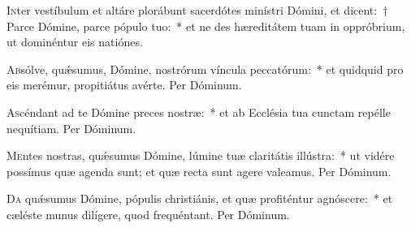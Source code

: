 \documentclass[vesperale_romanum.tex]{subfiles}
\begin{document}

\newpage
{}

\lettrine{I}{n}ter vestíbulum et altáre plorábunt sacerdótes minístri Dómini, et dicent:~† Parce Dómine, parce pópulo tuo:~* et ne des hæreditátem tuam in oppróbrium, ut dominéntur eis natiónes.





\oratio

\lettrine{A}{b}sólve, quǽsumus, Dómine, nostrórum víncula peccatórum:~* et quidquid pro eis merémur, propitiátus avérte.
Per Dóminum.



\oratio

\lettrine{A}{s}céndant ad te Dómine preces nostræ:~* et ab Ecclésia tua cunctam repélle nequítiam. Per Dóminum.



\oratio

\lettrine{M}{e}ntes nostras, quǽsumus Dómine, lúmine tuæ claritátis illústra:~* ut vidére possímus quæ agenda sunt; et quæ recta sunt agere valeamus. Per Dóminum.



\oratio

\lettrine{D}{a} quǽsumus Dómine, pópulis christiánis, et quæ profiténtur agnóscere:~* et cæléste munus dilígere, quod frequéntant. Per Dóminum.


\end{document}
